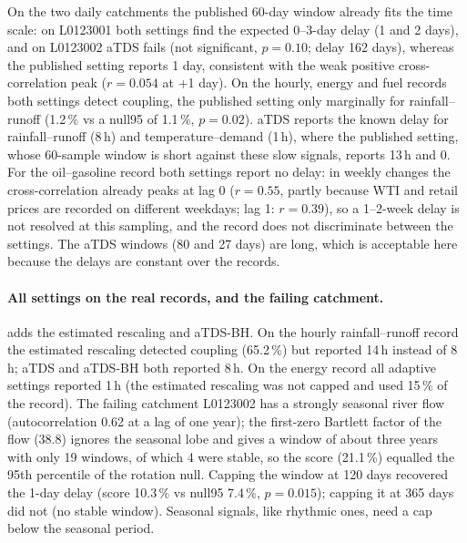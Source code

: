 \documentclass[11pt,a4paper]{article}
\begin{document}
On the two daily catchments the published 60-day window already fits the time scale: on L0123001 both settings find the expected 0--3-day delay (1 and 2 days), and on L0123002 aTDS fails (not significant, $p = 0.10$; delay 162 days), whereas the published setting reports 1 day, consistent with the weak positive cross-correlation peak ($r = 0.054$ at +1 day). On the hourly, energy and fuel records both settings detect coupling, the published setting only marginally for rainfall--runoff (1.2\,\% vs a null95 of 1.1\,\%, $p = 0.02$). aTDS reports the known delay for rainfall--runoff (8\,h) and temperature--demand (1\,h), where the published setting, whose 60-sample window is short against these slow signals, reports 13\,h and 0. For the oil--gasoline record both settings report no delay: in weekly changes the cross-correlation already peaks at lag 0 ($r = 0.55$, partly because WTI and retail prices are recorded on different weekdays; lag 1: $r = 0.39$), so a 1--2-week delay is not resolved at this sampling, and the record does not discriminate between the settings. The aTDS windows (80 and 27 days) are long, which is acceptable here because the delays are constant over the records.

\paragraph{All settings on the real records, and the failing catchment.}  adds the estimated rescaling and aTDS-BH. On the hourly rainfall--runoff record the estimated rescaling detected coupling (65.2\,\%) but reported 14\,h instead of 8\,h; aTDS and aTDS-BH both reported 8\,h. On the energy record all adaptive settings reported 1\,h (the estimated rescaling was not capped and used 15\,\% of the record). The failing catchment L0123002 has a strongly seasonal river flow (autocorrelation 0.62 at a lag of one year); the first-zero Bartlett factor of the flow (38.8) ignores the seasonal lobe and gives a window of about three years with only 19 windows, of which 4 were stable, so the score (21.1\,\%) equalled the 95th percentile of the rotation null. Capping the window at 120 days recovered the 1-day delay (score 10.3\,\% vs null95 7.4\,\%, $p = 0.015$); capping it at 365 days did not (no stable window). Seasonal signals, like rhythmic ones, need a cap below the seasonal period.
\end{document}
